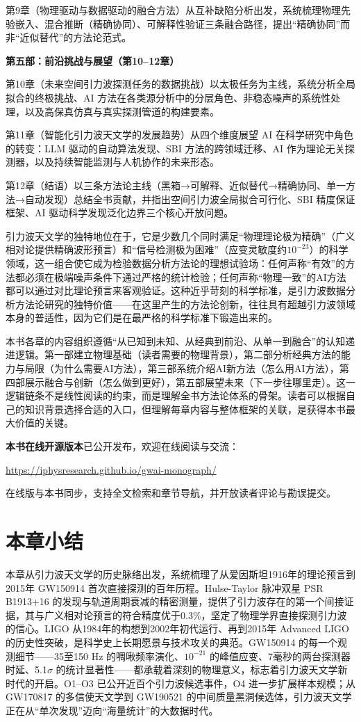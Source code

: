 第9章（物理驱动与数据驱动的融合方法）从互补缺陷分析出发，系统梳理物理先验嵌入、混合推断（精确协同）、可解释性验证三条融合路径，提出“精确协同”而非“近似替代”的方法论范式。

\textbf{第五部：前沿挑战与展望（第10--12章）}

第10章（未来空间引力波探测任务的数据挑战）以太极任务为主线，系统分析全局拟合的终极挑战、AI 方法在各类源分析中的分层角色、非稳态噪声的系统性处理，以及高保真仿真与真实探测管道的构建要素。

第11章（智能化引力波天文学的发展趋势）从四个维度展望 AI 在科学研究中角色的转变：LLM 驱动的自动算法发现、SBI 方法的跨领域迁移、AI 作为理论无关探测器，以及持续智能监测与人机协作的未来形态。

第12章（结语）以三条方法论主线（黑箱→可解释、近似替代→精确协同、单一方法→自动发现）总结全书贡献，并指出空间引力波全局拟合可行化、SBI 精度保证框架、AI 驱动科学发现泛化边界三个核心开放问题。

引力波天文学的独特地位在于，它是少数几个同时满足“物理理论极为精确”（广义相对论提供精确波形预言）和“信号检测极为困难”（应变灵敏度约$10^{-23}$）的科学领域，这一组合使它成为检验数据分析方法论的理想试验场：任何声称“有效”的方法都必须在极端噪声条件下通过严格的统计检验；任何声称“物理一致”的AI方法都可以通过对比理论预言来客观验证。这种近乎苛刻的科学标准，是引力波数据分析方法论研究的独特价值——在这里产生的方法论创新，往往具有超越引力波领域本身的普适性，因为它们是在最严格的科学标准下锻造出来的。

本书各章的内容组织遵循“从已知到未知、从经典到前沿、从单一到融合”的认知递进逻辑。第一部建立物理基础（读者需要的物理背景），第二部分析经典方法的能力与局限（为什么需要AI方法），第三部系统介绍AI新方法（怎么用AI方法），第四部展示融合与创新（怎么做到更好），第五部展望未来（下一步往哪里走）。这一逻辑链条不是线性阅读的约束，而是理解全书方法论体系的骨架。读者可以根据自己的知识背景选择合适的入口，但理解每章内容与整体框架的关联，是获得本书最大价值的关键。

\textbf{本书在线开源版本}已公开发布，欢迎在线阅读与交流：
\begin{center}
\url{https://iphysresearch.github.io/gwai-monograph/}
\end{center}
在线版与本书同步，支持全文检索和章节导航，并开放读者评论与勘误提交。

\section{本章小结}

本章从引力波天文学的历史脉络出发，系统梳理了从爱因斯坦1916年的理论预言到2015年 GW150914 首次直接探测的百年历程。Hulse-Taylor 脉冲双星 PSR B1913+16 的发现与轨道周期衰减的精密测量，提供了引力波存在的第一个间接证据，其与广义相对论预言的符合精度优于0.3\%，坚定了物理学界直接探测引力波的信心。LIGO 从1984年的构想到2002年初代运行、再到2015年 Advanced LIGO 的历史性突破，是科学史上长期愿景与技术攻关的典范。GW150914 的每一个观测细节——35至150 Hz 的啁啾频率演化、$10^{-21}$ 的峰值应变、7毫秒的两台探测器时延、5.1$\sigma$ 的统计显著性——都承载着深刻的物理意义，标志着引力波天文学新时代的开启。O1--O3 已公开近百个引力波候选事件，O4 进一步扩展样本规模；从 GW170817 的多信使天文学到 GW190521 的中间质量黑洞候选体，引力波天文学正在从“单次发现”迈向“海量统计”的大数据时代。

